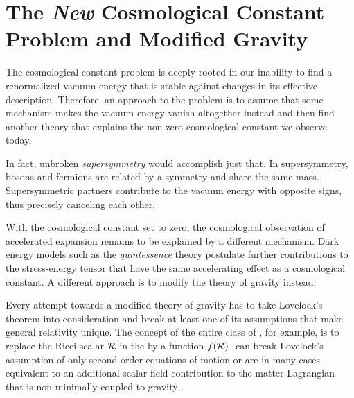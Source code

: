 \documentclass[12pt,parskip=half]{scrreprt}
\begin{document}

\section{The \emph{New} Cosmological Constant Problem and Modified Gravity}\label{ch:cc_problem_new}

The cosmological constant problem is deeply rooted in our inability to find a renormalized vacuum energy that is stable against changes in its effective description. Therefore, an approach to the problem is to assume that some mechanism makes the vacuum energy vanish altogether instead and then find another theory that explains the non-zero cosmological constant we observe today.

In fact, unbroken \emph{supersymmetry} would accomplish just that. In supersymmetry, bosons and fermions are related by a symmetry and share the same mass. Supersymmetric partners contribute to the vacuum energy with opposite signs, thus precisely canceling each other.

With the cosmological constant set to zero, the cosmological observation of accelerated expansion  remains to be explained by a different mechanism. Dark energy models such as the \emph{quintessence} theory \autocite{Wetterich1988,Ratra1988} postulate further contributions to the stress-energy tensor that have the same accelerating effect as a cosmological constant. A different approach is to modify the theory of gravity instead.

Every attempt towards a modified theory of gravity has to take Lovelock's theorem into consideration and break at least one of its assumptions that make general relativity unique. The concept of the entire class of \emph{}, for example, is to replace the Ricci scalar \(\mathcal{R}\) in the  by a function \(f(\mathcal{R})\).
 can break Lovelock's assumption of only second-order equations of motion or are in many cases equivalent to an additional scalar field contribution to the matter Lagrangian that is non-minimally coupled to gravity \autocite{Clifton2012,Euclid2013}.
\end{document}
